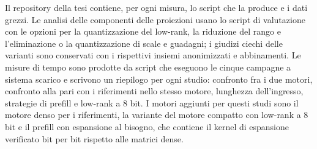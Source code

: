 Il repository della tesi contiene, per ogni misura, lo script che la produce e i dati grezzi. Le analisi delle componenti delle proiezioni usano lo script di valutazione con le opzioni per la quantizzazione del low-rank, la riduzione del rango e l'eliminazione o la quantizzazione di scale e guadagni; i giudizi ciechi delle varianti sono conservati con i rispettivi insiemi anonimizzati e abbinamenti. Le misure di tempo sono prodotte da script che eseguono le cinque campagne a sistema scarico e scrivono un riepilogo per ogni studio: confronto fra i due motori, confronto alla pari con i riferimenti nello stesso motore, lunghezza dell'ingresso, strategie di prefill e low-rank a 8 bit. I motori aggiunti per questi studi sono il motore denso per i riferimenti, la variante del motore compatto con low-rank a 8 bit e il prefill con espansione al bisogno, che contiene il kernel di espansione verificato bit per bit rispetto alle matrici dense.
